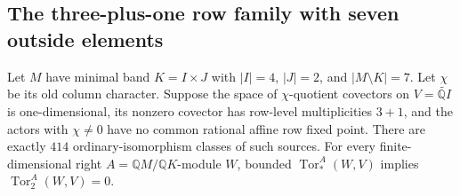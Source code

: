 \subsection{The three-plus-one row family with seven outside elements}

\begin{proposition}
\label{C:four-row-seven-outside-split-source}
Let $M$ have minimal band $K=I\times J$ with $|I|=4$, $|J|=2$,
and $|M\setminus K|=7$.  Let $\chi$ be its old column character.
Suppose the space of $\chi$-quotient covectors on
$V=\widetilde{\mathbb QI}$ is one-dimensional, its nonzero covector
has row-level multiplicities $3+1$, and the actors with $\chi\ne0$
have no common rational affine row fixed point.
There are exactly $414$ ordinary-isomorphism classes of such sources.
For every finite-dimensional right $A=\mathbb QM/\mathbb QK$-module
$W$, bounded $\operatorname{Tor}_*^A(W,V)$ implies
$\operatorname{Tor}_2^A(W,V)=0$.
\end{proposition}
